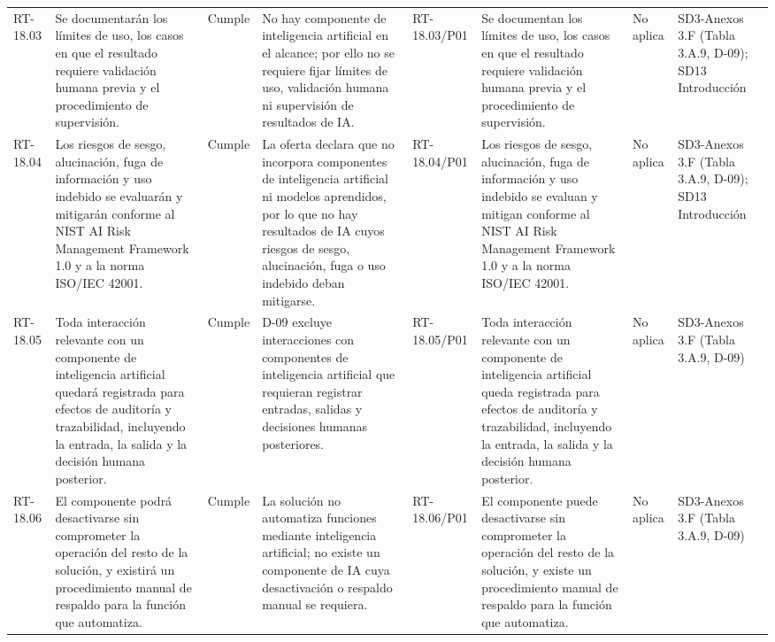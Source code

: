 \documentclass[oficio,firma,final]{lafrox}
\begin{document}
\begin{landscape}
{\begin{longtable}{@{}F{0.054} F{0.173} F{0.061} F{0.191} F{0.106} F{0.180} F{0.067} F{0.168}@{}}
  RT-18.03 & Se documentarán los límites de uso, los casos en que el resultado requiere validación humana previa y el procedimiento de supervisión. & Cumple & No hay componente de inteligencia artificial en el alcance; por ello no se requiere fijar límites de uso, validación humana ni supervisión de resultados de IA. & RT-18.03/\allowbreak{}P01 & Se documentan los límites de uso, los casos en que el resultado requiere validación humana previa y el procedimiento de supervisión. & No aplica & SD3-Anexos 3.F (Tabla 3.A.9, D-09); SD13 Introducción  \\
  RT-18.04 & Los riesgos de sesgo, alucinación, fuga de información y uso indebido se evaluarán y mitigarán conforme al NIST AI Risk Management Framework 1.0 y a la norma ISO/IEC 42001. & Cumple & La oferta declara que no incorpora componentes de inteligencia artificial ni modelos aprendidos, por lo que no hay resultados de IA cuyos riesgos de sesgo, alucinación, fuga o uso indebido deban mitigarse. & RT-18.04/\allowbreak{}P01 & Los riesgos de sesgo, alucinación, fuga de información y uso indebido se evaluan y mitigan conforme al NIST AI Risk Management Framework 1.0 y a la norma ISO/IEC 42001. & No aplica & SD3-Anexos 3.F (Tabla 3.A.9, D-09); SD13 Introducción  \\
  RT-18.05 & Toda interacción relevante con un componente de inteligencia artificial quedará registrada para efectos de auditoría y trazabilidad, incluyendo la entrada, la salida y la decisión humana posterior. & Cumple & D-09 excluye interacciones con componentes de inteligencia artificial que requieran registrar entradas, salidas y decisiones humanas posteriores. & RT-18.05/\allowbreak{}P01 & Toda interacción relevante con un componente de inteligencia artificial queda registrada para efectos de auditoría y trazabilidad, incluyendo la entrada, la salida y la decisión humana posterior. & No aplica & SD3-Anexos 3.F (Tabla 3.A.9, D-09)  \\
  RT-18.06 & El componente podrá desactivarse sin comprometer la operación del resto de la solución, y existirá un procedimiento manual de respaldo para la función que automatiza. & Cumple & La solución no automatiza funciones mediante inteligencia artificial; no existe un componente de IA cuya desactivación o respaldo manual se requiera. & RT-18.06/\allowbreak{}P01 & El componente puede desactivarse sin comprometer la operación del resto de la solución, y existe un procedimiento manual de respaldo para la función que automatiza. & No aplica & SD3-Anexos 3.F (Tabla 3.A.9, D-09)  \\

\end{longtable}}
\end{landscape}
\end{document}
